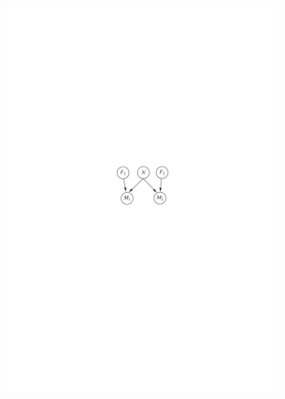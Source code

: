 \documentclass{article}
\begin{document}
\begin{figure}
\begin{subfigure}[t]{0.3\textwidth}
        \centering
        \includegraphics[scale = 0.7]{Figure/14-22(ii).pdf}
        \caption{}
        \label{14.22(ii)}
    \end{subfigure}
    \begin{subfigure}[t]{0.3\textwidth}
        \centering

\end{subfigure}
\end{figure}
\end{document}
